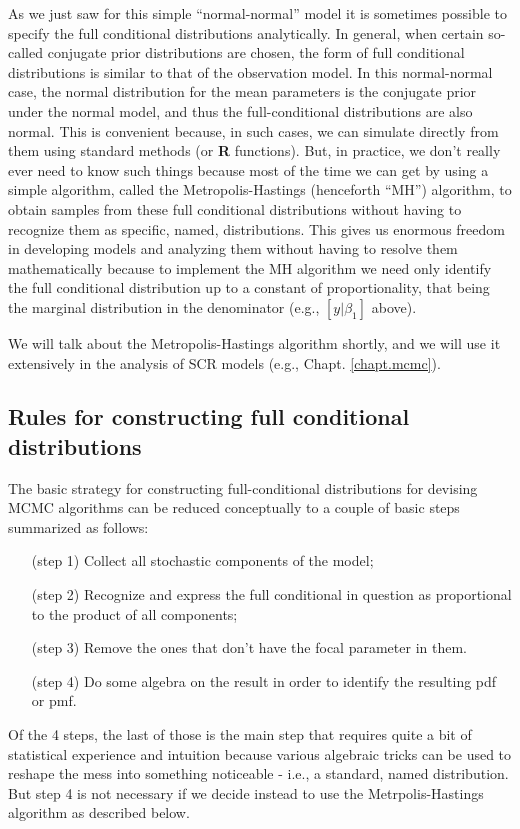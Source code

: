 As we just saw for this simple ``normal-normal'' model it is sometimes
possible to specify the full conditional distributions
analytically. In general, when certain so-called conjugate prior
distributions are chosen, the form of full conditional distributions
is similar to that of the observation model. In this normal-normal
case, the normal distribution for the mean parameters is the conjugate
prior under the normal model, and thus the full-conditional
distributions are also normal. This is convenient because, in such
cases, we can simulate directly from them using standard methods (or
{\bf R}
functions).  But, in practice, we don't really ever need to know such
things because most of the time we can get by using a simple
algorithm, called the Metropolis-Hastings (henceforth ``MH'')
algorithm, to obtain samples from these full conditional distributions
without having to recognize them as specific, named, distributions.
This gives us enormous freedom in developing models
and analyzing them without having to resolve them mathematically
because to implement the MH algorithm we need only identify the full
conditional distribution up to a constant of proportionality, that
being the marginal distribution in the denominator (e.g., $[y|\beta_1]$
above).

We will talk about the Metropolis-Hastings algorithm shortly, and we
will use it extensively in the analysis of SCR models (e.g., Chapt.
\ref{chapt.mcmc}).

\subsection{Rules for constructing full conditional distributions}
\label{glms.sec.rules}

The basic strategy for constructing full-conditional distributions for
devising MCMC algorithms can be reduced conceptually to a couple of
basic steps summarized as follows:
\begin{itemize}
\item[   (step 1)] Collect all stochastic components of the model;
\item[   (step 2)] Recognize and express the full conditional in question
  as proportional to the product of all components;
\item[   (step 3)] Remove the ones that don't have the focal parameter in them.
\item[   (step 4)] Do some algebra on the result in order to identify the resulting pdf or pmf.
\end{itemize}
Of the 4 steps, the last of those is the main step that requires quite
a bit of statistical experience and intuition because various
algebraic tricks can be used to reshape the mess into something
noticeable - i.e., a standard, named distribution. But step 4 is not
necessary if we decide instead to use the Metrpolis-Hastings algorithm
as described below.

